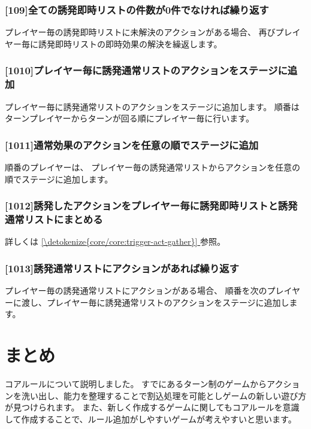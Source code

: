 \documentclass[letterpaper,10pt,dvipdfmx]{sphinxmanual}
\begin{document}
\subsubsection{{[}10\sphinxhyphen{}9{]}全ての誘発即時リストの件数が0件でなければ繰り返す}
\label{\detokenize{core/core:id38}}
\sphinxAtStartPar
プレイヤー毎の誘発即時リストに未解決のアクションがある場合、
再びプレイヤー毎に誘発即時リストの即時効果の解決を繰返します。


\subsubsection{{[}10\sphinxhyphen{}10{]}プレイヤー毎に誘発通常リストのアクションをステージに追加}
\label{\detokenize{core/core:id39}}
\sphinxAtStartPar
プレイヤー毎に誘発通常リストのアクションをステージに追加します。
順番はターンプレイヤーからターンが回る順にプレイヤー毎に行います。


\subsubsection{{[}10\sphinxhyphen{}11{]}通常効果のアクションを任意の順でステージに追加}
\label{\detokenize{core/core:id40}}
\sphinxAtStartPar
順番のプレイヤーは、 プレイヤー毎の誘発通常リストからアクションを任意の順でステージに追加します。


\subsubsection{{[}10\sphinxhyphen{}12{]}誘発したアクションをプレイヤー毎に誘発即時リストと誘発通常リストにまとめる}
\label{\detokenize{core/core:id41}}
\sphinxAtStartPar
詳しくは \hyperref[\detokenize{core/core:trigger-act-gather}]{\ref{\detokenize{core/core:trigger-act-gather}} } 参照。


\subsubsection{{[}10\sphinxhyphen{}13{]}誘発通常リストにアクションがあれば繰り返す}
\label{\detokenize{core/core:id42}}
\sphinxAtStartPar
プレイヤー毎の誘発通常リストにアクションがある場合、
順番を次のプレイヤーに渡し、プレイヤー毎に誘発通常リストのアクションをステージに追加します。


\section{まとめ}
\label{\detokenize{core/core:id43}}
\sphinxAtStartPar
コアルールについて説明しました。
すでにあるターン制のゲームからアクションを洗い出し、能力を整理することで割込処理を可能としゲームの新しい遊び方が見つけられます。
また、新しく作成するゲームに関してもコアルールを意識して作成することで、ルール追加がしやすいゲームが考えやすいと思います。
\end{document}
